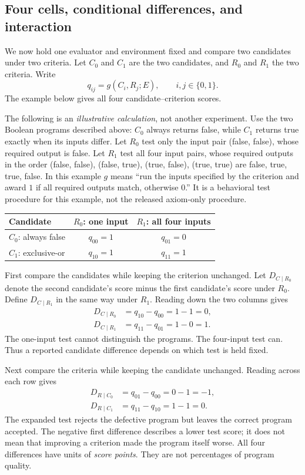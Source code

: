 \subsection{Four cells, conditional differences, and interaction}
\label{subsec:four-cells}

We now hold one evaluator and environment fixed and compare two candidates
under two criteria. Let $C_0$ and $C_1$ are the two
candidates, and $R_0$ and $R_1$ the two criteria. Write
\[
q_{ij}=g(C_i,R_j;E),\qquad i,j\in\{0,1\}.
\]
The example below gives all four candidate--criterion scores.

The following is an \emph{illustrative calculation}, not another experiment.
Use the two Boolean programs described above: $C_0$ always returns false,
while $C_1$ returns true exactly when its inputs differ. Let $R_0$ test only
the input pair (false, false), whose required output is false. Let $R_1$ test
all four input pairs, whose required outputs in the order (false, false),
(false, true), (true, false), (true, true) are false, true, true, false.
In this example $g$ means ``run the inputs specified by the criterion and
award $1$ if all required outputs match, otherwise $0$.'' It is a behavioral
test procedure for this example, not the released axiom-only procedure.

\begin{center}
\begin{tabular}{lcc}
\toprule
Candidate & $R_0$: one input & $R_1$: all four inputs\\
\midrule
$C_0$: always false & $q_{00}=1$ & $q_{01}=0$\\
$C_1$: exclusive-or & $q_{10}=1$ & $q_{11}=1$\\
\bottomrule
\end{tabular}
\end{center}

First compare the candidates while keeping the criterion unchanged. Let
$D_{C\mid R_0}$ denote the second candidate's score minus the first
candidate's score under $R_0$. Define $D_{C\mid R_1}$ in
the same way under $R_1$. Reading down the two columns gives
\begin{align*}
D_{C\mid R_0}&=q_{10}-q_{00}=1-1=0,\\
D_{C\mid R_1}&=q_{11}-q_{01}=1-0=1.
\end{align*}
The one-input test cannot distinguish the programs. The four-input test can.
Thus a reported candidate difference depends on which test is held fixed.

Next compare the criteria while keeping the candidate unchanged. Reading
across each row gives
\begin{align*}
D_{R\mid C_0}&=q_{01}-q_{00}=0-1=-1,\\
D_{R\mid C_1}&=q_{11}-q_{10}=1-1=0.
\end{align*}
The expanded test rejects the defective program but leaves the correct program
accepted. The negative first difference describes a lower test score; it does
not mean that improving a criterion made the program itself worse. All four
differences have units of \emph{score points}. They are not percentages of
program quality.

